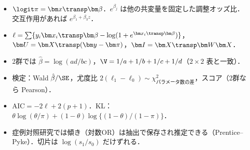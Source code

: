 \begin{summarybox}
\begin{itemize}
\item $\logit\pi=\bm x\transp\bm\beta$．$e^{\beta_j}$ は他の共変量を固定した調整オッズ比．交互作用があれば $e^{\beta_1+\beta_3z}$．
\item $\ell=\sum\{y_i\bm x_i\transp\bm\beta-\log(1+e^{\bm x_i\transp\bm\beta})\}$，$\bm U=\bm X\transp(\bm y-\bm\pi)$，$\bm I=\bm X\transp\bm W\bm X$．
\item 2群では $\hat\beta=\log(ad/bc)$，$\V=1/a+1/b+1/c+1/d$（$2\times2$ 表と一致）．
\item 検定：Wald $\hat\beta/\SE$，尤度比 $2(\ell_1-\ell_0)\sim\chi^2_{\text{パラメータ数の差}}$，スコア（2群なら Pearson）．
\item $\mathrm{AIC}=-2\ell+2(p+1)$．KL：$\theta\log(\theta/\pi)+(1-\theta)\log\{(1-\theta)/(1-\pi)\}$．
\item 症例対照研究では傾き（対数OR）は抽出で保存され推定できる（Prentice--Pyke）．切片は $\log(s_1/s_0)$ だけずれる．
\end{itemize}
\end{summarybox}
